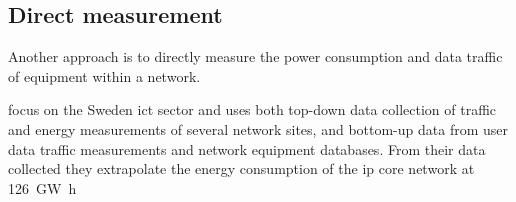 \subsection{Direct measurement}

Another approach is to directly measure the power consumption and data traffic of equipment within a network.


\citet{Malmodin2010} focus on the Sweden \ac{ict} sector and uses both top-down data collection of traffic and energy measurements of several network sites, and bottom-up data from user data traffic measurements and network equipment databases.  
From their data collected they extrapolate the energy consumption of the \ac{ip} core network at \SI{126}{\giga\watt\hour}


